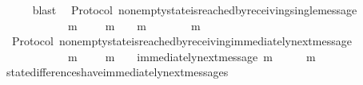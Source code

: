 \begin{isabellebody}
\ \ \ \ \isamarkupfalse%
\ blast\isanewline
{}\isamarkupfalse%
%
\endisatagproof
{\isafoldproof}%
%
\isadelimproof
\isanewline
%
\endisadelimproof
\isanewline
\isanewline
{}\isamarkupfalse%
\ {\isacharparenleft}\ Protocol{\isacharparenright}\ non{\isacharunderscore}empty{\isacharunderscore}state{\isacharunderscore}is{\isacharunderscore}reached{\isacharunderscore}by{\isacharunderscore}receiving{\isacharunderscore}single{\isacharunderscore}message\ {\isacharcolon}\isanewline
\ \ {\isachardoublequoteopen}{\isasymforall}\ {\isasymsigma}\ {\isasymin}\ {\isasymSigma}{\isachardot}\ {\isasymsigma}\ {\isasymnoteq}\ {\isasymemptyset}\ {\isasymlongrightarrow}\ {\isacharparenleft}{\isasymexists}\ {\isasymsigma}{\isacharprime}\ m{\isachardot}\ {\isasymsigma}{\isacharprime}\ {\isasymin}\ {\isasymSigma}\ {\isasymand}\ m\ {\isasymin}\ {\isasymsigma}\ {\isasymand}\ m\ {\isasymnotin}\ {\isasymsigma}{\isacharprime}\ {\isasymand}\ {\isasymsigma}\ {\isacharequal}\ {\isasymsigma}{\isacharprime}\ {\isasymunion}\ {\isacharbraceleft}m{\isacharbraceright}{\isacharparenright}{\isachardoublequoteclose}\isanewline
%
\isadelimproof
\ \ %
\endisadelimproof
%
\isatagproof
{}\isamarkupfalse%
%
\endisatagproof
{\isafoldproof}%
%
\isadelimproof
\isanewline
%
\endisadelimproof
\isanewline
{}\isamarkupfalse%
\ {\isacharparenleft}\ Protocol{\isacharparenright}\ non{\isacharunderscore}empty{\isacharunderscore}state{\isacharunderscore}is{\isacharunderscore}reached{\isacharunderscore}by{\isacharunderscore}receiving{\isacharunderscore}immediately{\isacharunderscore}next{\isacharunderscore}message\ {\isacharcolon}\isanewline
\ \ {\isachardoublequoteopen}{\isasymforall}\ {\isasymsigma}\ {\isasymin}\ {\isasymSigma}{\isachardot}\ {\isasymsigma}\ {\isasymnoteq}\ {\isasymemptyset}\ {\isasymlongrightarrow}\ {\isacharparenleft}{\isasymexists}\ {\isasymsigma}{\isacharprime}\ m{\isachardot}\ {\isasymsigma}{\isacharprime}\ {\isasymin}\ {\isasymSigma}\ {\isasymand}\ m\ {\isasymin}\ {\isasymsigma}\ {\isasymand}\ immediately{\isacharunderscore}next{\isacharunderscore}message{\isacharparenleft}{\isasymsigma}{\isacharprime}{\isacharcomma}\ m{\isacharparenright}\ {\isasymand}\ {\isasymsigma}\ {\isacharequal}\ {\isasymsigma}{\isacharprime}\ {\isasymunion}\ {\isacharbraceleft}m{\isacharbraceright}{\isacharparenright}{\isachardoublequoteclose}\isanewline
%
\isadelimproof
\ \ %
\endisadelimproof
%
\isatagproof
{}\isamarkupfalse%
\ state{\isacharunderscore}differences{\isacharunderscore}have{\isacharunderscore}immediately{\isacharunderscore}next{\isacharunderscore}messages\ \isanewline

\end{isabellebody}
